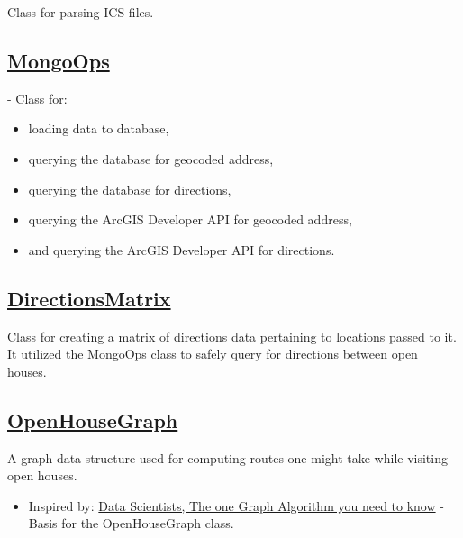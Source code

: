Class for parsing ICS files.
    

\subsection{\href{https://github.com/apjansing/Open-House-Route-Planner/blob/master/backend/docker/persistence/pyspark/MongoOps.py}{MongoOps}} \label{MongoOps} - Class for:
    \begin{itemize}
      \item loading data to database, 
      \item querying the database for geocoded address,
      \item querying the database for directions,
      \item querying the ArcGIS Developer API for geocoded address,
      \item and querying the ArcGIS Developer API for directions.
    \end{itemize}
    

\subsection{\href{https://github.com/apjansing/Open-House-Route-Planner/blob/master/backend/docker/persistence/pyspark/make_directions_matrix.py}{DirectionsMatrix}} \label{DirectionsMatrix}

Class for creating a matrix of directions data pertaining to locations passed to it. It utilized the MongoOps class to safely query for directions between open houses.
  

\subsection{\href{https://github.com/apjansing/Open-House-Route-Planner/blob/master/backend/docker/persistence/pyspark/OpenHouseGraph.py}{OpenHouseGraph}} \label{OpenHouseGraph}

A graph data structure used for computing routes one might take while visiting open houses.
  \begin{itemize}
    \item Inspired by: \href{https://towardsdatascience.com/to-all-data-scientists-the-one-graph-algorithm-you-need-to-know-59178dbb1ec2}{Data Scientists, The one Graph Algorithm you need to know}\cite{Agarwal} - Basis for the OpenHouseGraph class.
  \end{itemize}
  

